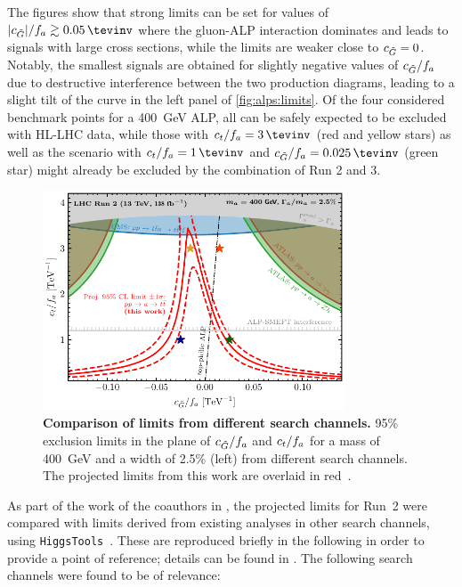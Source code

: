 The figures show that strong limits can be set for values of $|\cG|/f_a \gtrsim \SI{0.05}{\tevinv}$ where the gluon-ALP interaction dominates and leads to signals with large cross sections, while the limits are weaker close to $c_{\tilde{G}} = 0$. Notably, the smallest signals are obtained for slightly negative values of $c_{\tilde{G}}/f_a$ due to destructive interference between the two production diagrams, leading to a slight tilt of the curve in the left panel of \cref{fig:alps:limits}. Of the four considered benchmark points for a \SI{400}{\GeV} ALP, all can be safely expected to be excluded with HL-LHC data, while those with $\ct/f_a = \SI{3}{\tevinv}$ (red and yellow stars) as well as the scenario with $\ct/f_a = \SI{1}{\tevinv}$ and $\cG/f_a = \SI{+0.025}{\tevinv}$ (green star) might already be excluded by the combination of Run 2 and 3.

\begin{figure}[t]
    \centering
    \includegraphics[width=0.8\textwidth]{figures/alps/sum400.pdf}
    \caption{
        \textbf{Comparison of limits from different search channels.} 95\% exclusion limits in the plane of $c_{\tilde{G}}/f_a$ and $c_t/f_a$ for a mass of \SI{400}{\GeV} and a width of 2.5\% (left) from different search channels. The projected limits from this work are overlaid in red~\cite{Jeppe:2024sxt}.
    }
    \label{fig:alps:summary}
\end{figure}

As part of the work of the coauthors in , the projected limits for Run~2 were compared with limits derived from existing analyses in other search channels, using \texttt{HiggsTools}~\cite{Bahl:2022igd}. These are reproduced briefly in the following in order to provide a point of reference; details can be found in . The following search channels were found to be of relevance:

